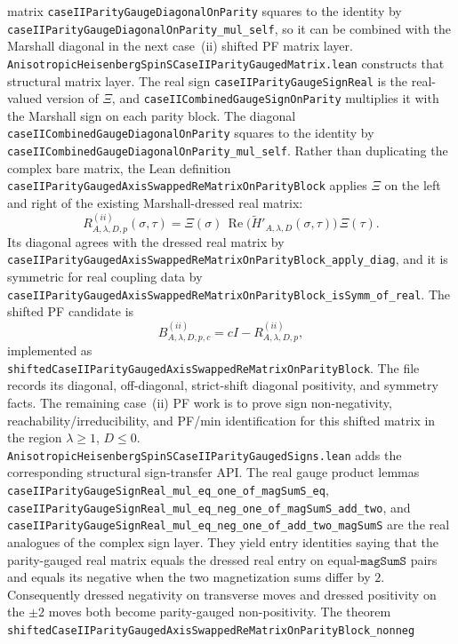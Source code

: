 \documentclass[a4paper,11pt]{article}
\begin{document}
matrix \texttt{caseIIParityGaugeDiagonalOnParity} squares to the identity by
\texttt{caseIIParityGaugeDiagonalOnParity\_mul\_self}, so it can be combined
with the Marshall diagonal in the next case~(ii) shifted PF matrix layer.
\texttt{AnisotropicHeisenbergSpinSCaseIIParityGaugedMatrix.lean} constructs
that structural matrix layer.  The real sign
\texttt{caseIIParityGaugeSignReal} is the real-valued version of \(\Xi\), and
\texttt{caseIICombinedGaugeSignOnParity} multiplies it with the Marshall sign
on each parity block.  The diagonal
\texttt{caseIICombinedGaugeDiagonalOnParity} squares to the identity by
\texttt{caseIICombinedGaugeDiagonalOnParity\_mul\_self}.  Rather than
duplicating the complex bare matrix, the Lean definition
\texttt{caseIIParityGaugedAxisSwappedReMatrixOnParityBlock} applies \(\Xi\) on
the left and right of the existing Marshall-dressed real matrix:
\[
  R^{(ii)}_{A,\lambda,D,p}(\sigma,\tau)
    = \Xi(\sigma)\,
      \operatorname{Re}\!\bigl(\widetilde H'_{A,\lambda,D}(\sigma,\tau)\bigr)\,
      \Xi(\tau).
\]
Its diagonal agrees with the dressed real matrix by
\texttt{caseIIParityGaugedAxisSwappedReMatrixOnParityBlock\_apply\_diag}, and
it is symmetric for real coupling data by
\texttt{caseIIParityGaugedAxisSwappedReMatrixOnParityBlock\_isSymm\_of\_real}.
The shifted PF candidate is
\[
  B^{(ii)}_{A,\lambda,D,p,c}
    = c I - R^{(ii)}_{A,\lambda,D,p},
\]
implemented as
\texttt{shiftedCaseIIParityGaugedAxisSwappedReMatrixOnParityBlock}.  The file
records its diagonal, off-diagonal, strict-shift diagonal positivity, and
symmetry facts.  The remaining case~(ii) PF work is to prove sign
non-negativity, reachability/irreducibility, and PF/min identification for
this shifted matrix in the region \(\lambda\ge1\), \(D\le0\).
\texttt{AnisotropicHeisenbergSpinSCaseIIParityGaugedSigns.lean} adds the
corresponding structural sign-transfer API.  The real gauge product lemmas
\texttt{caseIIParityGaugeSignReal\_mul\_eq\_one\_of\_magSumS\_eq},
\texttt{caseIIParityGaugeSignReal\_mul\_eq\_neg\_one\_of\_magSumS\_add\_two},
and
\texttt{caseIIParityGaugeSignReal\_mul\_eq\_neg\_one\_of\_add\_two\_magSumS}
are the real analogues of the complex sign layer.  They yield entry
identities saying that the parity-gauged real matrix equals the dressed real
entry on equal-\(\texttt{magSumS}\) pairs and equals its negative when the two
magnetization sums differ by \(2\).  Consequently dressed negativity on
transverse moves and dressed positivity on the \(\pm2\) moves both become
parity-gauged non-positivity.  The theorem
\texttt{shiftedCaseIIParityGaugedAxisSwappedReMatrixOnParityBlock\_nonneg}
\end{document}

